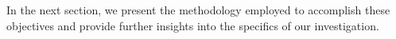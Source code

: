 \documentclass[a4paper,fleqn]{cas-dc}
\begin{document}
In the next section, we present the methodology employed to accomplish these objectives and provide further insights into the specifics of our investigation.









\end{document}
